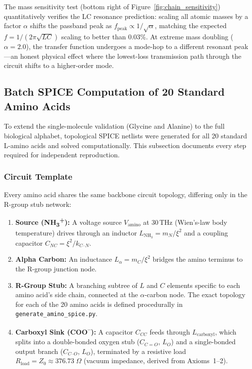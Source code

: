 The mass sensitivity test (bottom right of Figure~\ref{fig:chain_sensitivity}) quantitatively verifies the LC resonance prediction: scaling all atomic masses by a factor $\alpha$ shifts the passband peak as $f_\text{peak} \propto 1/\sqrt{\alpha}$, matching the expected $f = 1/(2\pi\sqrt{LC})$ scaling to better than 0.03\%. At extreme mass doubling ($\alpha = 2.0$), the transfer function undergoes a mode-hop to a different resonant peak---an honest physical effect where the lowest-loss transmission path through the circuit shifts to a higher-order mode.

\subsection{Batch SPICE Computation of 20 Standard Amino Acids}
\label{sec:batch_spice}

To extend the single-molecule validation (Glycine and Alanine) to the full biological alphabet, topological SPICE netlists were generated for all 20 standard L-amino acids and solved computationally. This subsection documents every step required for independent reproduction.

\subsubsection{Circuit Template}

Every amino acid shares the same backbone circuit topology, differing only in the R-group stub network:

\begin{enumerate}
    \item \textbf{Source (NH\textsubscript{3}\textsuperscript{+}):} A voltage source $V_\text{amino}$ at 30\,THz (Wien's-law body temperature) drives through an inductor $L_{\text{NH}_3} = m_N / \xi^2$ and a coupling capacitor $C_{NC} = \xi^2 / k_{C\text{--}N}$.
    \item \textbf{Alpha Carbon:} An inductance $L_\alpha = m_C / \xi^2$ bridges the amino terminus to the R-group junction node.
    \item \textbf{R-Group Stub:} A branching subtree of $L$ and $C$ elements specific to each amino acid's side chain, connected at the $\alpha$-carbon node. The exact topology for each of the 20 amino acids is defined procedurally in \texttt{generate\_amino\_spice.py}.
    \item \textbf{Carboxyl Sink (COO\textsuperscript{--}):} A capacitor $C_{CC}$ feeds through $L_\text{carboxyl}$, which splits into a double-bonded oxygen stub ($C_{C=O}$, $L_O$) and a single-bonded output branch ($C_{C\text{--}O}$, $L_O$), terminated by a resistive load $R_\text{load} = Z_0 \approx 376.73\;\Omega$ (vacuum impedance, derived from Axioms~1--2).
\end{enumerate}

